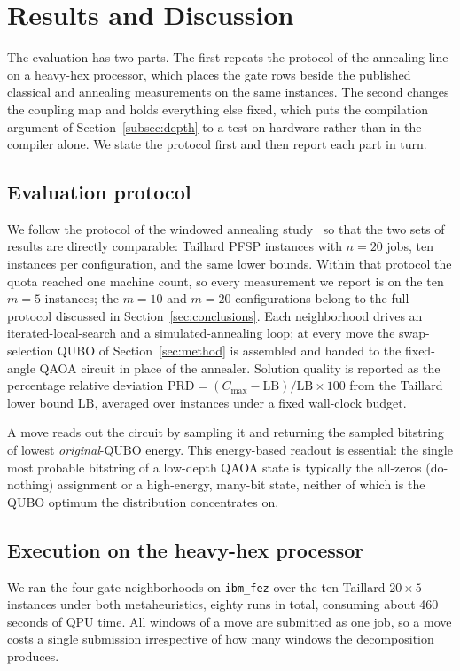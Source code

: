 \documentclass{svproc}
\begin{document}
\section{Results and Discussion}
\label{sec:results}
The evaluation has two parts. The first repeats the protocol of the annealing
line on a heavy-hex processor, which places the gate rows beside the published
classical and annealing measurements on the same instances. The second changes
the coupling map and holds everything else fixed, which puts the compilation
argument of Section~\ref{subsec:depth} to a test on hardware rather than in
the compiler alone. We state the protocol first and then report each part in
turn.

\subsection{Evaluation protocol}
We follow the protocol of the windowed annealing
study~\cite{wojewodzki2026windowed} so that the two sets of results are
directly comparable: Taillard PFSP instances with $n=20$ jobs, ten instances
per configuration, and the same lower bounds. Within that protocol the quota
reached one machine count, so every measurement we report is on the ten $m=5$
instances; the $m=10$ and $m=20$ configurations belong to the full protocol
discussed in Section~\ref{sec:conclusions}. Each
neighborhood drives an iterated-local-search and a simulated-annealing loop; at
every move the swap-selection QUBO of Section~\ref{sec:method} is assembled and
handed to the fixed-angle QAOA circuit in place of the annealer. Solution
quality is reported as the percentage relative deviation
$\mathrm{PRD}=(C_{\max}-\mathrm{LB})/\mathrm{LB}\times100$ from the Taillard
lower bound $\mathrm{LB}$, averaged over instances under a fixed wall-clock
budget.

A move reads out the circuit by sampling it and returning the sampled bitstring
of lowest \emph{original}-QUBO energy. This energy-based readout is essential:
the single most probable bitstring of a low-depth QAOA state is typically the
all-zeros (do-nothing) assignment or a high-energy, many-bit state, neither of
which is the QUBO optimum the distribution concentrates on.

\subsection{Execution on the heavy-hex processor}
\label{subsec:hwresults}
We ran the four gate neighborhoods on \texttt{ibm\_fez} over the ten Taillard
$20\times5$ instances under both metaheuristics, eighty runs in total, consuming
about 460 seconds of QPU time. All windows of a move are submitted as one job,
so a move costs a single submission irrespective of how many windows the
decomposition produces.
\end{document}
